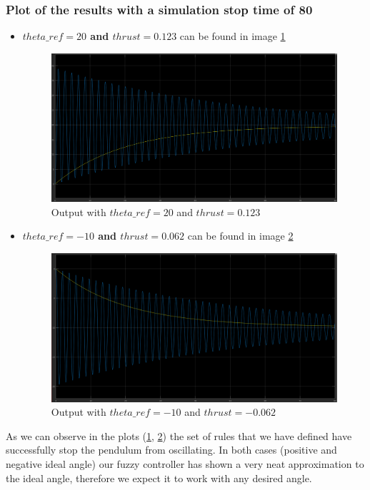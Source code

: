 \documentclass{article}[11pt]
\begin{document}
\subsubsection*{Plot of the results with a simulation stop time of 80}
\begin{itemize}
    \item \textbf{$theta\_ref = 20$ and $thrust = 0.123$} can be found in image \ref{fig:results_20}
        \begin{figure}[hbt!]
            \centering
            \centerline{\includegraphics[width=1.3\textwidth]{img/result_20.png}}
            \caption{Output with $theta\_ref = 20$ and $thrust = 0.123$}
            \label{fig:results_20}
        \end{figure}
        
    \item \textbf{$theta\_ref = -10$ and $thrust = 0.062$} can be found in image \ref{fig:results_-10}
        \begin{figure}[hbt!]
            \centering
            \centerline{\includegraphics[width=1.3\textwidth]{img/result_-10.png}}
            \caption{Output with $theta\_ref = -10$ and $thrust = -0.062$}
            \label{fig:results_-10}
        \end{figure}
\end{itemize}
As we can observe in the plots (\ref{fig:results_20}, \ref{fig:results_-10}) the set of rules that we have defined have successfully stop the pendulum from oscillating. In both cases (positive and negative ideal angle) our fuzzy controller has shown a very neat approximation to the ideal angle, therefore we expect it to work with any desired angle. 
\end{document}
